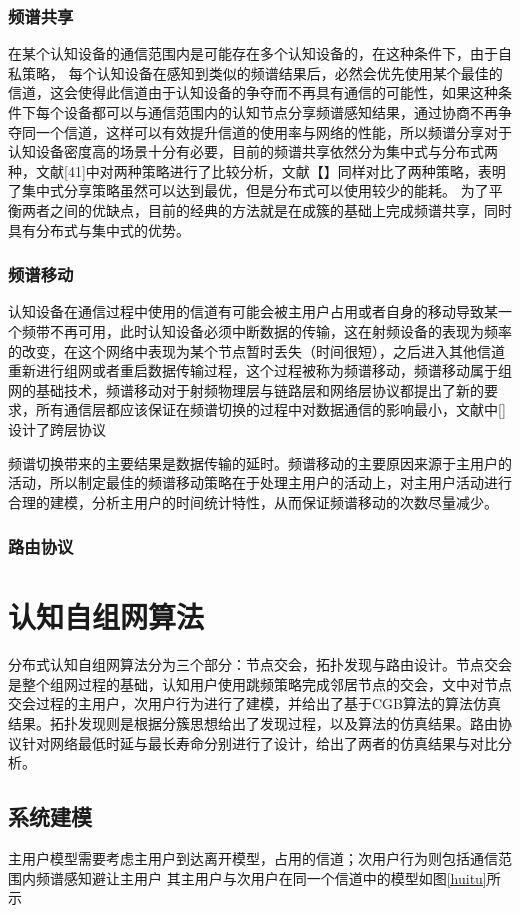 \documentclass[a4paper,AutoFakeBold,oneside,12pt]{book}
\begin{document}
\subsection{频谱共享}
  在某个认知设备的通信范围内是可能存在多个认知设备的，在这种条件下，由于自私策略， 每个认知设备在感知到类似的频谱结果后，必然会优先使用某个最佳的信道，这会使得此信道由于认知设备的争夺而不再具有通信的可能性，如果这种条件下每个设备都可以与通信范围内的认知节点分享频谱感知结果，通过协商不再争夺同一个信道，这样可以有效提升信道的使用率与网络的性能，所以频谱分享对于认知设备密度高的场景十分有必要，目前的频谱共享依然分为集中式与分布式两种，文献[41]中对两种策略进行了比较分析，文献【】同样对比了两种策略，表明了集中式分享策略虽然可以达到最优，但是分布式可以使用较少的能耗。
  为了平衡两者之间的优缺点，目前的经典的方法就是在成簇的基础上完成频谱共享，同时具有分布式与集中式的优势。
\subsection{频谱移动}
  认知设备在通信过程中使用的信道有可能会被主用户占用或者自身的移动导致某一个频带不再可用，此时认知设备必须中断数据的传输，这在射频设备的表现为频率的改变，在这个网络中表现为某个节点暂时丢失（时间很短），之后进入其他信道重新进行组网或者重启数据传输过程，这个过程被称为频谱移动，频谱移动属于组网的基础技术，频谱移动对于射频物理层与链路层和网络层协议都提出了新的要求，所有通信层都应该保证在频谱切换的过程中对数据通信的影响最小，文献中[]设计了跨层协议
  
  频谱切换带来的主要结果是数据传输的延时。频谱移动的主要原因来源于主用户的活动，所以制定最佳的频谱移动策略在于处理主用户的活动上，对主用户活动进行合理的建模，分析主用户的时间统计特性，从而保证频谱移动的次数尽量减少。
\subsection{路由协议}

\chapter{认知自组网算法}
  分布式认知自组网算法分为三个部分：节点交会，拓扑发现与路由设计。节点交会是整个组网过程的基础，认知用户使用跳频策略完成邻居节点的交会，文中对节点交会过程的主用户，次用户行为进行了建模，并给出了基于CGB算法的算法仿真结果。拓扑发现则是根据分簇思想给出了发现过程，以及算法的仿真结果。路由协议针对网络最低时延与最长寿命分别进行了设计，给出了两者的仿真结果与对比分析。
\section{系统建模}
  主用户模型需要考虑主用户到达离开模型，占用的信道；次用户行为则包括通信范围内频谱感知避让主用户
  其主用户与次用户在同一个信道中的模型如图\ref{huitu}所示
\end{document}
